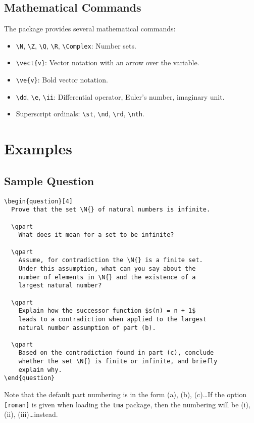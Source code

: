\documentclass[twoside]{article}
\begin{document}
\subsection{Mathematical Commands}

The package provides several mathematical commands:

\begin{itemize}
\item  \verb|\N|, \verb|\Z|, \verb|\Q|, \verb|\R|, \verb|\Complex|: Number sets.
\item  \verb|\vect{v}|: Vector notation with an arrow over the variable.
\item  \verb|\ve{v}|: Bold vector notation.
\item  \verb|\dd|, \verb|\e|, \verb|\ii|: Differential operator, Euler's number, imaginary unit.
\item  Superscript ordinals: \verb|\st|, \verb|\nd|, \verb|\rd|, \verb|\nth|.
\end{itemize}

\section{Examples}

\subsection{Sample Question}

\begin{verbatim}
\begin{question}[4]
  Prove that the set \N{} of natural numbers is infinite.
  
  \qpart
    What does it mean for a set to be infinite?
    
  \qpart
    Assume, for contradiction the \N{} is a finite set. 
    Under this assumption, what can you say about the 
    number of elements in \N{} and the existence of a 
    largest natural number?
    
  \qpart
    Explain how the successor function $s(n) = n + 1$ 
    leads to a contradiction when applied to the largest 
    natural number assumption of part (b).
    
  \qpart
    Based on the contradiction found in part (c), conclude 
    whether the set \N{} is finite or infinite, and briefly 
    explain why.
\end{question}
\end{verbatim}

Note that the default part numbering is in the form (a), (b), (c)\dots If the option \verb|[roman]| is given when loading the \verb|tma| package, then the numbering will be (i), (ii), (iii)\dots instead.
\end{document}
